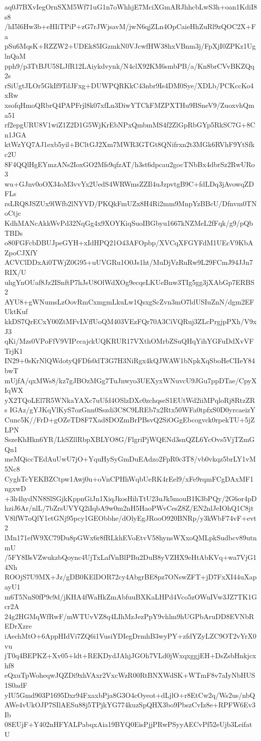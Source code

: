 aq0J7BXvIegOrnSXM5Wf71uG1n7oWhhjE7MciXGmARJhhcbLwS3h+oan1KdiI8s8
/hI5l6Hw3b+eHIiTPiP+zG7rJWjsavM/jwN6qjZLn4OpCaieHhZuRl9zQOC2X+Fa
pSu6MqsK+RZZW2+UDEk85IGzmkN0VJcwfHW38hxVBnm3j/FpXjI0ZPKz1UglnQaM
pph9/p3TtBJU5SLJfR12LAiykdvynk/N4clX92KM6smbPB/a/Kn8brCVvBKZQq2s
rSiUgtJLOr5GkIf9TdJFxg+DUWPQRKkC43nbr9Is4DM0Sye/XDLb/PCKccKo4xRw
xsofqHmoQRbrQ4PAPFrjl8k07xfLn3DiwYTCkFMZPXTHu9BSneV9/ZuoxvhQma51
rf2epgURU8V1wiZ1Z2D1G5WjKrEbNPxQmbmMS4f2ZlGpRbGYp5RkSC7G+8Cn1JGA
ktWzYQ7AJ1exb5yil+BCltGJ2Xm7MWR3GTGt8QNifrxn2t3MGk6RVhF9YtSfkc2U
8F4QQlHgEYmzANs2IoxGO2Mfs9qfzAT/h3st6dpcau2gocTNbBx4dbrSz2RwURo3
wu+GJnv0oOX34oM3vvYx2UedS4WRWmsZZIl4uJzpvtgB9C+fdLDq3jAvowqZDFLs
rsLRQ8JSZUx9lWfb2lNYVD/PKQkFmUZx8H4Ri2mm9MnpYzBBcU/Dfnvm0TNoCtjc
KdhMANcAkkWvPd32NqGg4x9XOYKiqSuoIBGbyu1667kNZMeL2fFqk/g9/pQbTBDs
o80FGFcbDBUJpeGYH+xIdHPQ21O43AFOpbp/XVCqXFGYFdM1UEcV9KbAZpoCJXfY
ACVClDDxAi0TWjZ0G95+uUVGRu1O0Js1ht/MuDjVzRuRw9L29FCmJ94JJn7RIX/U
uhgYnOUaf8Jz2ISnftP7hJsU8OlWdXOg9ecqeLKUeBnw3TIg5gg3jXAbGp7ERBS2
AYU8+gWNumsLzOovRmCxmgmLkuLw1QsxgScZvn3mO7ldUSIuZnN/dgm2EFUktKuf
kkDS7QrECxY00ZtMFvLVffUoQM403VEzFQr70A3CiVQRuj3ZLcPrgjpPXh/V9xJ3
qKi/Mzs0VPoFfV9VIPccajckUQKRUR17VXthOMrbZSuQHqYihYGFuDdXvVFTrjK1
IN29+0sKrNlQWdotyQFDfs0dT3G7H3NiRgx4kQJWAW1bNpkXqSboHeCIIeY84bwT
mUjfA/qxMWs8/kz7gJBOzMGg7TuJnwyo3UEXyxWNuvcU9JGu7ppDTae/CpyXIqWX
yX2TQoLEl7R5WNkaYAXc7uUfd4OSlzDXc0zchqseS1EUtWd2iiMPqloRj8RtzZRs
IGAz/gYJKqVlKyS7ozGnn0Sszdi3C8C9LREb7x2Rtx50WFa0tpfxS0D0yrcaeizY
Cunc5K//FrD+gOZeTD8F7Xad8DOZmBrPBsvQ2SiOGgEbcogvck0rpekTU+5jZLPN
SszeKhHkn6YR/LkSZllRbpXBLYO8G/FlgriPjWQENd3snQZL6YcOvs5VjTZmGQn1
meMQiccTEdAuUwU7jO+YquHySyGmDuEAdzo2FpR0c3T8/vb0vkqz5brLY1vM5Nc8
CyghTcYEKBZCtpw1Awj0u+oVnCPHhWqbUeRK4rEel9/xFe9rqmFCgDAxMF1ngxwD
+3h4hydNN8SlSGjkKppnGiJn1XiqJkosHihTtU23uJk5mouB1K3bPQy/2G6or4pD
hziJ6Ar/nlL/7bZrsUVYQ2iIqbA9w0m2nH5HaoPWvCesZ8Z/EN2nlJeIOhQ1C8jt
V8lfW7oQlY1etGNj95pcy1GEObbhe/dOlyEgJRooO920BNRp/y3kWbF74vF+evt2
lMn171efW9XC79Du8pGWx6r8fRLkhEVoEtvV58hynsWXxoQMLpkSudbcv89utnmU
/5FY8BsVZwukzbQoync4UjTxLafVnBlPBu2DuB8yVZHX9eHtAbKVq+wa7VjG14Nh
ROOjS7U9MX+Jz/gDB0KElDOR72cy4AbgrBE8pz7ONswZFT+jD7FxXI44uXapayU1
m6T5NnS0fP9c9d/jKHA4fWaHkZmAbfuuBXKaLHPd4Vco5zOWuIVw3JZ7TK1Gcr2A
24g2HGMqWfRwF/mWTUvVZ8q4LIhMzJezPpY9vhlm9hUGPbAruDD8EVNbREDrXzre
iAechMtO+6AppHIdVi7ZQ6i1VusiYDIegDrmhB3wyPY+zfdYZyLZC9OT2vYrX0vu
jT0q4BEPKZ+Xv05+ldt+REKDydJAhjJGOh7VLd0jWxqxggjEH+DsZsbHnkjcxhf8
eQxuTpWoheqwJQZDi9xhVAxr2VxcWzR00RtBNXWdSK+WTmF8v7aIyNbHUS1S0adF
yIU5Gmd903P1695Dxr94FxaxbPja8G3O4cOyeot+dLjlO+r8EtCw2q/Ws2us/nbQ
AWe4vUkOJP7SIlAESu88j5TPjkYG774kuzSpQHX3bo9PbszCvIz8e+RPFW6Ev3Ib
08EUjF+Y402nHFYALPabqxAia19BYQ0EisPjjPRwPSyyAECvPf52eUjb3LeifatU
